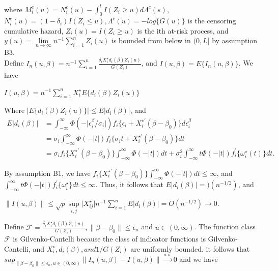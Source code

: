 \documentclass[titlepage,english,12pt]{article}
\begin{document}
	\noindent where $M_i^c(u) = N_i^c(u)-\int_{0}^{t}I(Z_i\geq u)d\Lambda^c(s)$, $N_i^c(u)=(1-\delta_i)I(Z_i\leq u), \Lambda^c(u) = -log\{G(u)\}$ is the censoring cumulative hazard, $Z_i(u)=I(Z_i \geq u)$ is the ith at-risk process, and $y(u)=\lim\limits_{n \to \infty} n^{-1} \sum_{i=1}^{n} Z_i(u)$ is bounded from below in $(0,L]$ by assumption B3.\\
	
	\noindent Define $I_n(u,\beta)=n^{-1} \sum_{i=1}^{n}\frac{\delta_i X_i^\star d_i(\beta)Z_i(u)}{G(Z_i)}$, and $I(u,\beta)=E\{I_n(u,\beta)\}$. We have
	\begin{center}
		$I(u,\beta)=n^{-1} \sum_{i=1}^{n}X_i^\star E\{d_i(\beta)Z_i(u)\}$
	\end{center}
	Where $\lvert E\{d_i(\beta)Z_i(u)\} \rvert \leq E\lvert d_i(\beta) \rvert$, and
	\begin{align*}
	E\lvert d_i(\beta) \rvert & = \int_{-\infty}^{\infty} \Phi(-\lvert\epsilon_i^\beta/\sigma_i\rvert)f_i\{\epsilon_i+X_i^{\star \prime}(\beta-\beta_0)\}d\epsilon_i^\beta\\
	& = \sigma_i \int_{-\infty}^{\infty} \Phi(-\lvert t \rvert)f_i\{\sigma_i t+X_i^{\star \prime}(\beta-\beta_0)\}dt\\
	& = \sigma_i f_i\{X_i^{\star \prime}(\beta-\beta_0)\}\int_{-\infty}^{\infty} \Phi (- \lvert t \rvert)dt + \sigma_i^2 \int_{-\infty}^{\infty}t \Phi (- \lvert t \rvert) f_i^\prime \{\omega_i^\star(t) \}dt.
	\end{align*}
	
	\noindent By assumption B1, we have $f_i\{X_i^{\star \prime}(\beta-\beta_0) \}\int_{-\infty}^{\infty}\Phi(- \lvert t \rvert)dt \leq \infty$, and \mbox{$\int_{-\infty}^{\infty} t \Phi(- \lvert t \rvert)f_i^\prime\{\omega_i^{\star} \}dt\leq \infty$}. Thus, it follows that $E\lvert d_i(\beta) \rvert=)(n^{-1/2})$, and
	
	\begin{center}
		$\lVert I(u,\beta) \rVert \leq \sqrt{p} \sup\limits_{i,j} \lvert X_{ij}^{\star} \rvert n^{-1}\sum_{i=1}^{n} E \lvert d_i(\beta) \rvert = O(n^{-1/2}) \to 0$.
	\end{center}
	
	\noindent Define $\mathcal{F}=\frac{\delta_i X_i^\star d_i(\beta) Z_i(u)}{G(Z_i)}, \lVert \beta - \beta_0 \rVert \leq \epsilon_n$ and $u \in (0, \infty)$. The function class $\mathcal{F}$ is Gilvenko-Cantelli \citet{vaart1996weak} because the class of indicator functions is Gilvenko-Cantelli, and $X_i^\star, d_i(\beta), and 1/G(Z_i)$ are uniformly bounded. it follows that $sup_{\lVert \beta - \beta_0 \rVert \leq \epsilon_n, u \in (0,\infty)} \lVert I_n(u,\beta)- I(u, \beta) \rVert \xrightarrow{a.s.} 0$ and we have
	
\end{document}
